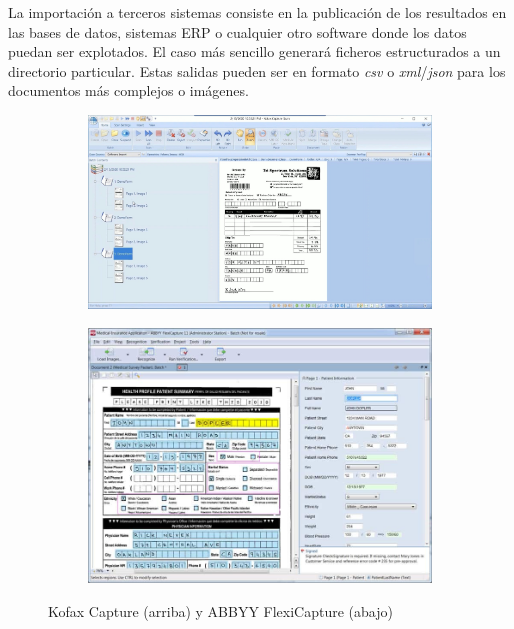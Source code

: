 \begin{itemize}
    La importación a terceros sistemas consiste en la publicación de los resultados en las bases de datos, sistemas ERP o cualquier otro software donde los datos puedan ser explotados. El caso más sencillo generará ficheros estructurados a un directorio particular. Estas salidas pueden ser en formato \emph{\acrlong{csv}} o \emph{\acrlong{xml}}/\emph{\acrlong{json}} para los documentos más complejos o imágenes.
\end{itemize}

\begin{figure}
    \centering
    \begin{subfigure}[b]{0.9\textwidth}
        \centering
        \includegraphics[width=\textwidth]{imaxes/b-estado-arte/kofax-capture}
        \label{fig:hough-punto-imagen}
    \end{subfigure}
    \begin{subfigure}[b]{0.9\textwidth}
        \centering
        \includegraphics[width=\textwidth]{imaxes/b-estado-arte/abbyy-flexicapture}
        \label{fig:hough-intersection}
    \end{subfigure}
    \caption{Kofax Capture (arriba) y ABBYY FlexiCapture (abajo)}
    \label{fig:kofax-capture-y-abbyy-flexicapture}
\end{figure}

